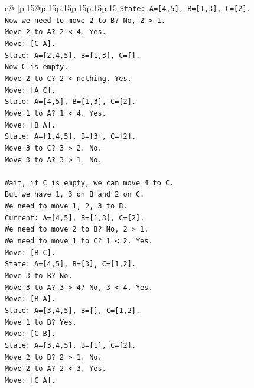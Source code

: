 \documentclass{article}
\begin{document}
{\begin{supertabular}{c@{$\;$}|p{.15\linewidth}@{}p{.15\linewidth}p{.15\linewidth}p{.15\linewidth}p{.15\linewidth}p{.15\linewidth}}
{{{\texttt{State: A={[}4,5{]}, B={[}1,3{]}, C={[}2{]}.} \\
\texttt{Now we need to move 2 to B? No, 2 > 1.} \\
\texttt{Move 2 to A? 2 < 4. Yes.} \\
\texttt{Move: {[}C A{]}.} \\
\texttt{State: A={[}2,4,5{]}, B={[}1,3{]}, C={[}{]}.} \\
\texttt{Now C is empty.} \\
\texttt{Move 2 to C? 2 < nothing. Yes.} \\
\texttt{Move: {[}A C{]}.} \\
\texttt{State: A={[}4,5{]}, B={[}1,3{]}, C={[}2{]}.} \\
\texttt{Move 1 to A? 1 < 4. Yes.} \\
\texttt{Move: {[}B A{]}.} \\
\texttt{State: A={[}1,4,5{]}, B={[}3{]}, C={[}2{]}.} \\
\texttt{Move 3 to C? 3 > 2. No.} \\
\texttt{Move 3 to A? 3 > 1. No.} \\
\\ 
\texttt{Wait, if C is empty, we can move 4 to C.} \\
\texttt{But we have 1, 3 on B and 2 on C.} \\
\texttt{We need to move 1, 2, 3 to B.} \\
\texttt{Current: A={[}4,5{]}, B={[}1,3{]}, C={[}2{]}.} \\
\texttt{We need to move 2 to B? No, 2 > 1.} \\
\texttt{We need to move 1 to C? 1 < 2. Yes.} \\
\texttt{Move: {[}B C{]}.} \\
\texttt{State: A={[}4,5{]}, B={[}3{]}, C={[}1,2{]}.} \\
\texttt{Move 3 to B? No.} \\
\texttt{Move 3 to A? 3 > 4? No, 3 < 4. Yes.} \\
\texttt{Move: {[}B A{]}.} \\
\texttt{State: A={[}3,4,5{]}, B={[}{]}, C={[}1,2{]}.} \\
\texttt{Move 1 to B? Yes.} \\
\texttt{Move: {[}C B{]}.} \\
\texttt{State: A={[}3,4,5{]}, B={[}1{]}, C={[}2{]}.} \\
\texttt{Move 2 to B? 2 > 1. No.} \\
\texttt{Move 2 to A? 2 < 3. Yes.} \\
\texttt{Move: {[}C A{]}.} \\
}}}
\end{supertabular}}
\end{document}
